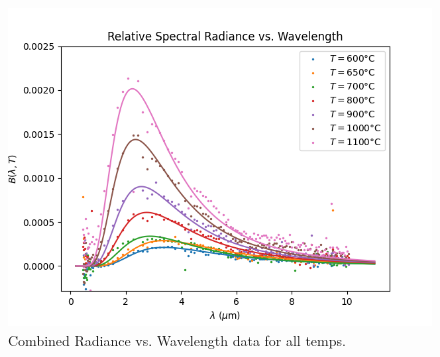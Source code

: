 \documentclass[10pt,letterpaper,onecolumn]{article}
\begin{document}
\begin{figure}[ht]
  \begin{center}
  \includegraphics*[width=4.5in]{CombinedRadvAngle.png}
  \caption{Combined Radiance vs. Wavelength data for all temps.\label{fig:combinedrad} }
  \end{center}
 \end{figure}
 
\end{document}
